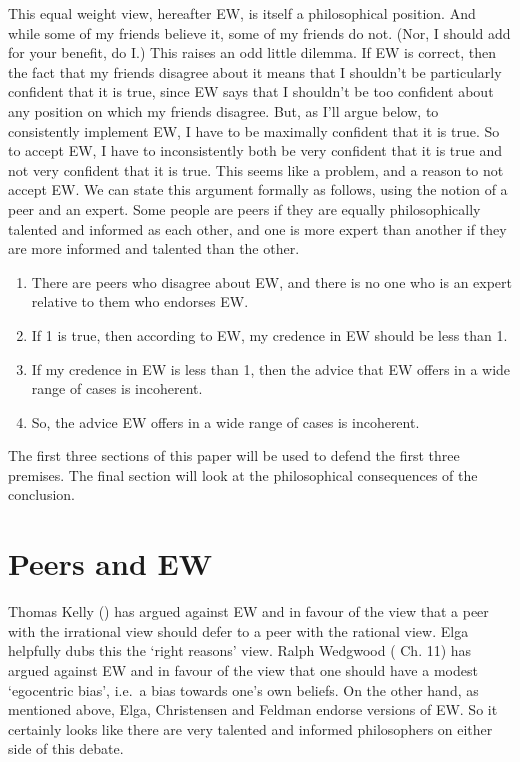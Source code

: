\documentclass[
  10pt,
  letterpaper,
  DIV=11,
  numbers=noendperiod,
  twoside]{scrartcl}
\providecommand{\tightlist}{%
  \setlength{\itemsep}{0pt}\setlength{\parskip}{0pt}}\usepackage{longtable,booktabs,array}
\begin{document}
This equal weight view, hereafter EW, is itself a philosophical
position. And while some of my friends believe it, some of my friends do
not. (Nor, I should add for your benefit, do I.) This raises an odd
little dilemma. If EW is correct, then the fact that my friends disagree
about it means that I shouldn't be particularly confident that it is
true, since EW says that I shouldn't be too confident about any position
on which my friends disagree. But, as I'll argue below, to consistently
implement EW, I have to be maximally confident that it is true. So to
accept EW, I have to inconsistently both be very confident that it is
true and not very confident that it is true. This seems like a problem,
and a reason to not accept EW. We can state this argument formally as
follows, using the notion of a peer and an expert. Some people are peers
if they are equally philosophically talented and informed as each other,
and one is more expert than another if they are more informed and
talented than the other.

\begin{enumerate}
\def\labelenumi{\arabic{enumi}.}
\tightlist
\item
  There are peers who disagree about EW, and there is no one who is an
  expert relative to them who endorses EW.
\item
  If 1 is true, then according to EW, my credence in EW should be less
  than 1.
\item
  If my credence in EW is less than 1, then the advice that EW offers in
  a wide range of cases is incoherent.
\item
  So, the advice EW offers in a wide range of cases is incoherent.
\end{enumerate}

The first three sections of this paper will be used to defend the first
three premises. The final section will look at the philosophical
consequences of the conclusion.

\section{Peers and EW}\label{peers-and-ew}

Thomas Kelly () has argued against
EW and in favour of the view that a peer with the irrational view should
defer to a peer with the rational view. Elga helpfully dubs this the
`right reasons' view. Ralph Wedgwood
( Ch. 11) has argued against EW
and in favour of the view that one should have a modest `egocentric
bias', i.e.~a bias towards one's own beliefs. On the other hand, as
mentioned above, Elga, Christensen and Feldman endorse versions of EW.
So it certainly looks like there are very talented and informed
philosophers on either side of this debate.
\end{document}
